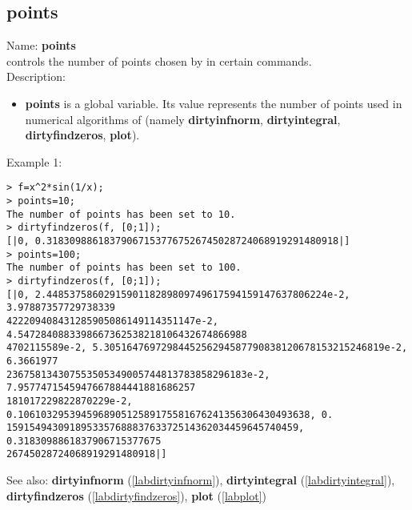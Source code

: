 \subsection{points}
\label{labpoints}
\noindent Name: \textbf{points}\\
controls the number of points chosen by \sollya in certain commands.\\
\noindent Description: \begin{itemize}

\item \textbf{points} is a global variable. Its value represents the number of points
   used in numerical algorithms of \sollya (namely \textbf{dirtyinfnorm},
   \textbf{dirtyintegral}, \textbf{dirtyfindzeros}, \textbf{plot}).
\end{itemize}
\noindent Example 1: 
\begin{center}\begin{minipage}{15cm}\begin{Verbatim}[frame=single]
> f=x^2*sin(1/x);
> points=10;
The number of points has been set to 10.
> dirtyfindzeros(f, [0;1]);
[|0, 0.318309886183790671537767526745028724068919291480918|]
> points=100;
The number of points has been set to 100.
> dirtyfindzeros(f, [0;1]);
[|0, 2.4485375860291590118289809749617594159147637806224e-2, 3.97887357729738339
422209408431285905086149114351147e-2, 4.5472840883398667362538218106432674866988
4702115589e-2, 5.3051647697298445256294587790838120678153215246819e-2, 6.3661977
236758134307553505349005744813783858296183e-2, 7.9577471545947667884441881686257
181017229822870229e-2, 0.106103295394596890512589175581676241356306430493638, 0.
159154943091895335768883763372514362034459645740459, 0.3183098861837906715377675
26745028724068919291480918|]
\end{Verbatim}
\end{minipage}\end{center}
See also: \textbf{dirtyinfnorm} (\ref{labdirtyinfnorm}), \textbf{dirtyintegral} (\ref{labdirtyintegral}), \textbf{dirtyfindzeros} (\ref{labdirtyfindzeros}), \textbf{plot} (\ref{labplot})
